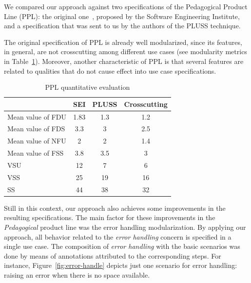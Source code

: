 \documentclass{acm_proc_article-sp}
\begin{document}
We compared our approach against two specifications of the Pedagogical Product
Line (PPL): the original one~\cite{ppl-url}, proposed by the Software Engineering
Institute, and a specification that was sent to us by the authors of the PLUSS
technique.

The original specification of PPL is already well modularized, since its
features, in general, are not crosscutting among different use cases (see
modularity metrics in Table~\ref{tab:ppl-metrics}). Moreover, another
characteristic of PPL is that several features are related to qualities that do
not cause effect into use case specifications.

\begin{table}[hb]
\centering
\caption{PPL quantitative evaluation}
\label{tab:ppl-metrics}
\begin{small}
\begin{tabular}{lccc} \hline
					& SEI 	& PLUSS 	& Crosscutting	\\ \hline
Mean value of FDU 		& 1.83	& 1.3	& 1.2	\\
Mean value of FDS 		& 3.3	& 3		& 2.5	\\
Mean value of NFU 		& 2		& 2		& 1.4	\\
Mean value of FSS 		& 3.8	& 3.5	& 3		\\ 
VSU 					& 12		& 7		& 6		\\
VSS 					& 25		& 19		& 16		\\
SS 					& 44		& 38		& 32		\\	\hline
\end{tabular}
\end{small}
\end{table}

Still in this context, our approach also achieves some improvements in the
resulting specifications. The main factor for these improvements in the
\emph{Pedagogical} product line was the error handling modularization. By
applying our approach, all behavior related to the \emph{error handling} concern
is specified in a single use case. The composition of \emph{error handling} with
the basic scenarios was done by means of annotations attributed to the
corresponding steps. For instance, Figure~\ref{fig:error-handle} depicts just one
scenario for error handling: raising  an error when there is no space available.
\end{document}
